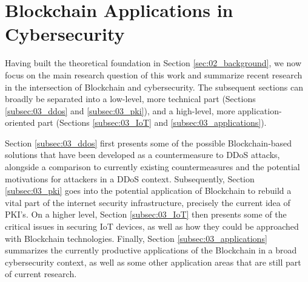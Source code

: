 \section{Blockchain Applications in Cybersecurity}
\label{sec:03_related_work}

Having built the theoretical foundation in Section \ref{sec:02_background}, we now focus on the main research question of this work and summarize recent research in the intersection of Blockchain and cybersecurity. The subsequent sections can broadly be separated into a low-level, more technical part (Sections \ref{subsec:03_ddos} and \ref{subsec:03_pki}), and a high-level, more application-oriented part (Sections \ref{subsec:03_IoT} and \ref{subsec:03_applications}).

Section \ref{subsec:03_ddos} first presents some of the possible Blockchain-based solutions that have been developed as a countermeasure to DDoS attacks, alongside a comparison to currently existing countermeasures and the potential motivations for attackers in a DDoS context. Subsequently, Section \ref{subsec:03_pki} goes into the potential application of Blockchain to rebuild a vital part of the internet security infrastructure, precisely the current idea of PKI's. On a higher level, Section \ref{subsec:03_IoT} then presents some of the critical issues in securing IoT devices, as well as how they could be approached with Blockchain technologies. Finally, Section \ref{subsec:03_applications} summarizes the currently productive applications of the Blockchain in a broad cybersecurity context, as well as some other application areas that are still part of current research.





